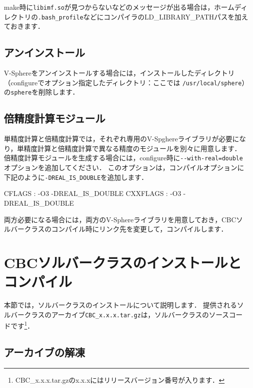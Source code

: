 make時に\verb|libimf.so|が見つからないなどのメッセージが出る場合は，ホームディレクトリの\verb|.bash_profile|などにコンパイラのLD\_LIBRARY\_PATHパスを加えておきます．
{\small
{}
}

%
\subsection{アンインストール}
V-Sphereをアンインストールする場合には，インストールしたディレクトリ（configureでオプション指定したディレクトリ：ここでは \verb|/usr/local/sphere|）の\verb|sphere|を削除します．

%
\subsection{倍精度計算モジュール}
単精度計算と倍精度計算では，それぞれ専用のV-Spghereライブラリが必要になり，単精度計算と倍精度計算で異なる精度のモジュールを別々に用意します．
倍精度計算モジュールを生成する場合には，configure時に\verb|--with-real=double|オプションを追加してください．
このオプションは，コンパイルオプションに下記のように\verb|-DREAL_IS_DOUBLE|を追加します．

{\small
\begin{program}
CFLAGS         : -O3 -DREAL_IS_DOUBLE
CXXFLAGS       : -O3 -DREAL_IS_DOUBLE
\end{program}
}

両方必要になる場合には，両方のV-Sphereライブラリを用意しておき，CBCソルバークラスのコンパイル時にリンク先を変更して，コンパイルします．


\hypertarget{tgt:installCBC}{\section{CBCソルバークラスのインストールとコンパイル}}
\label{sec:install CBC}

本節では，ソルバークラスのインストールについて説明します．
提供されるソルバークラスのアーカイブ\verb|CBC_x.x.x.tar.gz|は，ソルバークラスのソースコードです\footnote{CBC\_x.x.x.tar.gzのx.x.xにはリリースバージョン番号が入ります．}．

\subsection{アーカイブの解凍}
{\small
{}
}

